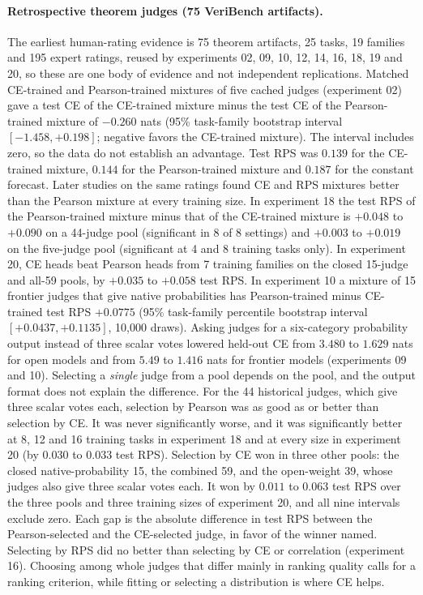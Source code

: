\paragraph{Retrospective theorem judges (75 VeriBench artifacts).}
The earliest human-rating evidence is 75 theorem artifacts, 25 tasks, 19 families and 195 expert ratings, reused by experiments 02, 09, 10, 12, 14, 16, 18, 19 and 20, so these are one body of evidence and not independent replications.
Matched CE-trained and Pearson-trained mixtures of five cached judges (experiment 02) gave a test CE of the CE-trained mixture minus the test CE of the Pearson-trained mixture of $-0.260$ nats (95\% task-family bootstrap interval $[-1.458,+0.198]$; negative favors the CE-trained mixture). The interval includes zero, so the data do not establish an advantage.
Test RPS was $0.139$ for the CE-trained mixture, $0.144$ for the Pearson-trained mixture and $0.187$ for the constant forecast.
Later studies on the same ratings found CE and RPS mixtures better than the Pearson mixture at every training size.
In experiment 18 the test RPS of the Pearson-trained mixture minus that of the CE-trained mixture is $+0.048$ to $+0.090$ on a 44-judge pool (significant in 8 of 8 settings) and $+0.003$ to $+0.019$ on the five-judge pool (significant at 4 and 8 training tasks only).
In experiment 20, CE heads beat Pearson heads from 7 training families on the closed 15-judge and all-59 pools, by $+0.035$ to $+0.058$ test RPS.
In experiment 10 a mixture of 15 frontier judges that give native probabilities has Pearson-trained minus CE-trained test RPS $+0.0775$ (95\% task-family percentile bootstrap interval $[+0.0437,+0.1135]$, 10{,}000 draws).
Asking judges for a six-category probability output instead of three scalar votes lowered held-out CE from $3.480$ to $1.629$ nats for open models and from $5.49$ to $1.416$ nats for frontier models (experiments 09 and 10).
Selecting a \emph{single} judge from a pool depends on the pool, and the output format does not explain the difference.
For the 44 historical judges, which give three scalar votes each, selection by Pearson was as good as or better than selection by CE.
It was never significantly worse, and it was significantly better at 8, 12 and 16 training tasks in experiment 18 and at every size in experiment 20 (by $0.030$ to $0.033$ test RPS).
Selection by CE won in three other pools: the closed native-probability 15, the combined 59, and the open-weight 39, whose judges also give three scalar votes each.
It won by $0.011$ to $0.063$ test RPS over the three pools and three training sizes of experiment 20, and all nine intervals exclude zero.
Each gap is the absolute difference in test RPS between the Pearson-selected and the CE-selected judge, in favor of the winner named.
Selecting by RPS did no better than selecting by CE or correlation (experiment 16).
Choosing among whole judges that differ mainly in ranking quality calls for a ranking criterion, while fitting or selecting a distribution is where CE helps.

